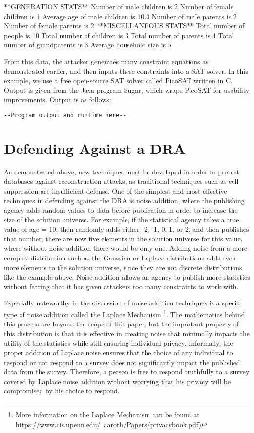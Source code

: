 \documentclass[jou,apacite]{apa6}
\begin{document}
**GENERATION STATS**
Number of male children is 2
Number of female children is 1
Average age of male children is 10.0
Number of male parents is 2
Number of female parents is 2
**MISCELLANEOUS STATS**
Total number of people is 10
Total number of children is 3
Total number of parents is 4
Total number of grandparents is 3
Average household size is 5

From this data, the attacker generates many constraint equations as demonstrated earlier,
and then inputs these constraints into a SAT solver. In this example, we use a free open-source SAT solver
called PicoSAT written in C. Output is given from the Java program Sugar, which wraps PicoSAT for usability improvements.
\newline Output is as follows:
\begin{verbatim}
--Program output and runtime here--
\end{verbatim}

\section{Defending Against a DRA}
As demonstrated above, new techniques must be developed in
order to protect databases against reconstruction attacks, as traditional techniques such as cell suppression are insufficient defense. One of the simplest and most effective techniques in defending against the DRA is noise addition, where the publishing agency adds random values to data before publication in order to increase the size of the solution universe. For example, if the statistical agency takes a true value of age = 10, then randomly adds either -2, -1, 0, 1, or 2, and then publishes that number, there are now five elements in the solution universe for this value, where without noise addition there would be only one. Adding noise from a more complex distribution such as the Gaussian or Laplace distributions adds even more elements to the solution universe, since they are not discrete distributions like the example above. Noise addition allows an agency to publish more statistics without fearing that it has given attackers too many constraints to work with.

Especially noteworthy in the discussion of noise addition techniques is a special type of noise addition called the Laplace Mechanism \footnote{More information on the Laplace Mechanism can be found at https://www.cis.upenn.edu/~aaroth/Papers/privacybook.pdf)}.
The mathematics behind this process are beyond the scope of this paper, but the important property of this distribution is that it is effective in creating noise that minimally impacts the utility of the statistics while still ensuring individual privacy. Informally, the proper addition of Laplace noise ensures that the choice of any individual to respond or not respond to a survey does not significantly impact the published data from the survey. Therefore, a person is free to respond truthfully to a survey covered by Laplace noise addition without worrying that his privacy will be compromised by his choice to respond.
\end{document}
